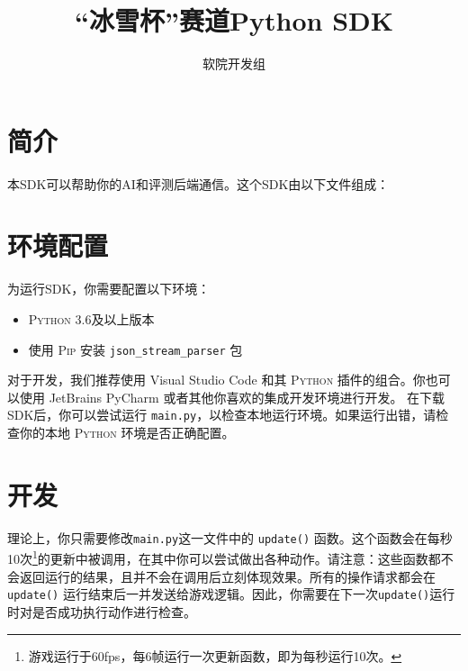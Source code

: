 \documentclass{article}
\title{“冰雪杯”赛道Python SDK}
\author{软院开发组}
\begin{document}
\maketitle

\section{简介}

本SDK可以帮助你的AI和评测后端通信。这个SDK由以下文件组成：


\section{环境配置}

为运行SDK，你需要配置以下环境：
	\begin{itemize}\setlength\itemsep{0em}
		\item \textsc{Python} 3.6及以上版本
		\item 使用 \textsc{Pip} 安装 \texttt{json\_stream\_parser} 包
	\end{itemize}
	对于开发，我们推荐使用 Visual Studio Code 和其 \textsc{Python} 插件的组合。你也可以使用 JetBrains PyCharm 或者其他你喜欢的集成开发环境进行开发。
	在下载SDK后，你可以尝试运行 \texttt{main.py}，以检查本地运行环境。如果运行出错，请检查你的本地 \textsc{Python} 环境是否正确配置。

\section{开发}

理论上，你只需要修改\texttt{main.py}这一文件中的 \texttt{update()} 函数。这个函数会在每秒10次\footnote{游戏运行于60fps，每6帧运行一次更新函数，即为每秒运行10次。}的更新中被调用，在其中你可以尝试做出各种动作。请注意：这些函数都不会返回运行的结果，且并不会在调用后立刻体现效果。所有的操作请求都会在 \texttt{update()} 运行结束后一并发送给游戏逻辑。因此，你需要在下一次\texttt{update()}运行时对是否成功执行动作进行检查。
\end{document}
